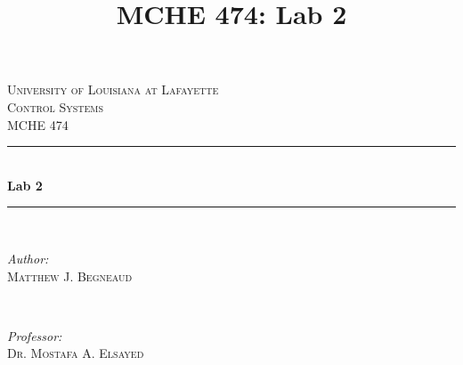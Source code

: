 \documentclass[12pt]{article}
\title{MCHE 474: Lab 2}
\begin{document}




\begin{titlepage}

\newcommand{\HRule}{\rule{\linewidth}{0.5mm}} %

\center %
 

\textsc{\LARGE University of Louisiana at Lafayette}\\[1.5cm] %
\textsc{\Large Control Systems}\\[0.5cm] %
\textsc{\large MCHE 474}\\[0.5cm] %


\HRule \\[0.4cm]
{ \huge \bfseries Lab 2}\\[0.4cm] %
\HRule \\[1.5cm]
 

\begin{minipage}{0.4\textwidth}
\begin{flushleft} \large
\emph{Author:}\\
\textsc{Matthew J. Begneaud} \\%
\end{flushleft}
\end{minipage}
~
\begin{minipage}{0.4\textwidth}
\begin{flushright} \large
\emph{Professor:} \\
\textsc{Dr. Mostafa A. Elsayed} %
\end{flushright}
\end{minipage}\\[1.5cm]


\end{titlepage}
\end{document}
